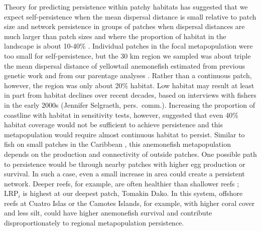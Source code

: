 \documentclass[12pt, oneside]{article}   	%
\begin{document}
Theory for predicting persistence within patchy habitats has suggested that we expect self-persistence when the mean dispersal distance is small relative to patch size and network persistence in groups of patches when dispersal distances are much larger than patch sizes and where the proportion of habitat in the landscape is about 10-40\% \citep[depending on the particular species, population, and maximum reproductive rate,][]{botsford2019population}. Individual patches in the focal metapopulation were too small for self-persistence, but the 30 km region we sampled was about triple the mean dispersal distance of yellowtail anemonefish estimated from previous genetic work \citep[around 9 km,][]{pinsky2010using} and from our parentage analyses \citep[8.2 km,][]{catalanoInPrepconnectivity}. Rather than a continuous patch, however, the region was only about 20\% habitat. Low habitat may result at least in part from habitat declines over recent decades, based on interviews with fishers in the early 2000s (Jennifer Selgraeth, pers.\ comm.). Increasing the proportion of coastline with habitat in sensitivity tests, however, suggested that even 40\% habitat coverage would not be sufficient to achieve persistence and this metapopulation would require almost continuous habitat to persist. Similar to fish on small patches in the Caribbean \citep{johnson2018integrating}, this anemonefish metapopulation depends on the production and connectivity of outside patches. One possible path to persistence would be through nearby patches with higher egg production or survival. In such a case, even a small increase in area could create a persistent network. Deeper reefs, for example, are often healthier than shallower reefs \citep{cinner2016bright}; $\text{LRP}_i$ is highest at our deepest patch, Tomakin Dako. In this system, offshore reefs at Cuatro Islas or the Camotes Islands, for example, with higher coral cover and less silt, could have higher anemonefish survival and contribute disproportionately to regional metapopulation persistence.

\end{document}

